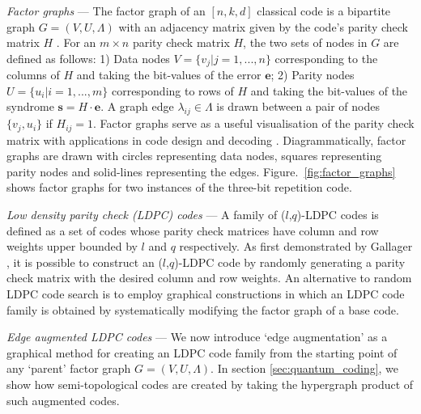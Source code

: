 \documentclass[%
 reprint,
superscriptaddress,
nofootinbib,
 amsmath,amssymb,
secnumarabic
]{revtex4-1}
\begin{document}
\textit{Factor graphs} --- The factor graph of an $[n,k,d]$ classical code is a bipartite graph $G=(V,U,\Lambda)$ with an adjacency matrix given by the code's parity check matrix $H$ \cite{tanner1981recursive}. For an $m\times n$ parity check matrix $H$, the two sets of nodes in $G$ are defined as follows: 1) Data nodes $V=\{v_j | j=1,...,n\}$ corresponding to the columns of $H$ and taking the bit-values of the error $\mathbf{e}$; 2) Parity nodes $U=\{u_i| i=1,...,m\}$ corresponding to rows of $H$ and taking the bit-values of the syndrome $\mathbf{s}=H\cdot \mathbf{e}$. A graph edge $\lambda_{ij}\in\Lambda$ is drawn between a pair of nodes $\{v_j, u_i\}$ if $H_{ij}=1$. Factor graphs serve as a useful visualisation of the parity check matrix with applications in code design and decoding \cite{kschischang2001factor,roffe2020quantum}. Diagrammatically, factor graphs are drawn with circles representing data nodes, squares representing parity nodes and solid-lines representing the edges. Figure.~\ref{fig:factor_graphs} shows factor graphs for two instances of the three-bit repetition code.




\textit{Low density parity check (LDPC) codes} --- A family of ($l$,$q$)-LDPC codes is defined as a set of codes whose parity check matrices have column and row weights upper bounded by $l$ and $q$ respectively. As first demonstrated by Gallager \cite{gallager1962}, it is possible to construct an ($l$,$q$)-LDPC code by randomly generating a parity check matrix with the desired column and row weights.  An alternative to random LDPC code search is to employ graphical constructions in which an LDPC code family is obtained by systematically modifying the factor graph of a base code.


\textit{Edge augmented LDPC codes} --- We now introduce `edge augmentation' as a graphical method for creating an LDPC code family from the starting point of any `parent' factor graph $G=(V,U,\Lambda)$. In section \ref{sec:quantum_coding}, we show how semi-topological codes are created by taking the hypergraph product of such augmented codes.
\end{document}
